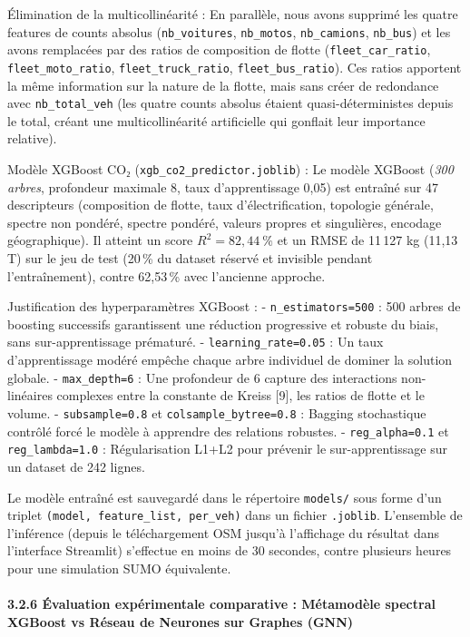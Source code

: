 \documentclass[10pt, a4paper]{article}
\begin{document}
Élimination de la multicollinéarité : En parallèle, nous avons supprimé
les quatre features de counts absolus (\texttt{nb\_voitures},
\texttt{nb\_motos}, \texttt{nb\_camions}, \texttt{nb\_bus}) et les avons
remplacées par des ratios de composition de flotte
(\texttt{fleet\_car\_ratio}, \texttt{fleet\_moto\_ratio},
\texttt{fleet\_truck\_ratio}, \texttt{fleet\_bus\_ratio}). Ces ratios
apportent la même information sur la nature de la flotte, mais sans
créer de redondance avec \texttt{nb\_total\_veh} (les quatre counts
absolus étaient quasi-déterministes depuis le total, créant une
multicollinéarité artificielle qui gonflait leur importance relative).

Modèle XGBoost CO₂ (\texttt{xgb\_co2\_predictor.joblib}) : Le modèle
XGBoost (\emph{300 arbres}, profondeur maximale 8, taux d'apprentissage
0,05) est entraîné sur 47 descripteurs (composition de flotte, taux
d'électrification, topologie générale, spectre non pondéré, spectre
pondéré, valeurs propres et singulières, encodage géographique). Il
atteint un score \(R^2 = 82{,}44\ \%\) et un RMSE de 11\,127 kg (11,13
T) sur le jeu de test (20\,\% du dataset réservé et invisible pendant
l'entraînement), contre 62,53\,\% avec l'ancienne approche.

Justification des hyperparamètres XGBoost : - \texttt{n\_estimators=500}
: 500 arbres de boosting successifs garantissent une réduction
progressive et robuste du biais, sans sur-apprentissage prématuré. -
\texttt{learning\_rate=0.05} : Un taux d'apprentissage modéré empêche
chaque arbre individuel de dominer la solution globale. -
\texttt{max\_depth=6} : Une profondeur de 6 capture des interactions
non-linéaires complexes entre la constante de Kreiss {[}9{]}, les ratios
de flotte et le volume. - \texttt{subsample=0.8} et
\texttt{colsample\_bytree=0.8} : Bagging stochastique contrôlé forcé le
modèle à apprendre des relations robustes. - \texttt{reg\_alpha=0.1} et
\texttt{reg\_lambda=1.0} : Régularisation L1+L2 pour prévenir le
sur-apprentissage sur un dataset de 242 lignes.

Le modèle entraîné est sauvegardé dans le répertoire \texttt{models/}
sous forme d'un triplet
\texttt{(model,\ feature\_list,\ \textquotesingle{}per\_veh\textquotesingle{})}
dans un fichier \texttt{.joblib}. L'ensemble de l'inférence (depuis le
téléchargement OSM jusqu'à l'affichage du résultat dans l'interface
Streamlit) s'effectue en moins de 30 secondes, contre plusieurs heures
pour une simulation SUMO équivalente.

\paragraph{3.2.6 Évaluation expérimentale comparative : Métamodèle
spectral XGBoost vs Réseau de Neurones sur Graphes
(GNN)}\label{uxe9valuation-expuxe9rimentale-comparative-muxe9tamoduxe8le-spectral-xgboost-vs-ruxe9seau-de-neurones-sur-graphes-gnn}
\end{document}
